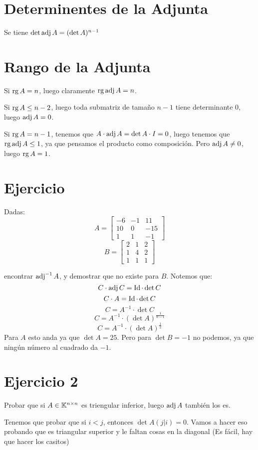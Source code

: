 \documentclass{article}
\begin{document}
\section*{Determinentes de la Adjunta}
Se tiene $\det \operatorname{adj} A = (\det A)^{n-1}$
\section*{Rango de la Adjunta}
Si $\operatorname{rg} A = n$, luego claramente $\operatorname{rg} \operatorname{adj} A = n$.

Si $\operatorname{rg} A \leq n-2$, luego toda submatriz de tamaño $n-1$ tiene determinante $0$, luego $\operatorname{adj} A = 0$.

Si $\operatorname{rg} A = n-1$, tenemos que $A \cdot \operatorname{adj} A = \det A \cdot I = 0$, luego tenemos que $\operatorname{rg} \operatorname{adj} A \leq 1$, ya que pensamos el producto como composición. Pero $\operatorname{adj} A \neq 0$, luego $\operatorname{rg} A = 1$.

\section*{Ejercicio}
Dadas:
\[
	A = 
	\begin{bmatrix}
		-6 & -1 & 11 \\
		10 & 0 & -15 \\
		1 & 1 & -1
	\end{bmatrix}
\]
\[
	B = 
	\begin{bmatrix}
		2 & 1 & 2 \\
		1 & 4 & 2 \\
		1 & 1 & 1
	\end{bmatrix}
\]

encontrar $\operatorname{adj}^{-1} A$, y demostrar que no existe para $B$.
Notemos que:
\[
	C \cdot \operatorname{adj} C = \operatorname{Id} \cdot \det C
\]
\[
	C \cdot A = \operatorname{Id} \cdot \det C
\]
\[
	C = A^{-1} \cdot \det C
\]
\[
	C = A^{-1} \cdot (\det A)^{\frac{1}{n-1}}
\]
\[
	C = A^{-1} \cdot (\det A)^{\frac{1}{2}}
\]
Para $A$ esto anda ya que $\det A = 25$. Pero para $\det B = -1$ no podemos, ya que ningún número al cuadrado da $-1$.

\section*{Ejercicio 2}
Probar que si $A \in \mathbb{K}^{n \times n}$ es triengular inferior, luego $\operatorname{adj} A$ también los es.

Tenemos que probar que si $i < j$, entonces $\det A(j|i) = 0$. Vamos a hacer eso probando que es triangular superior y le faltan cosas en la diagonal (Es fácil, hay que hacer los casitos)
\end{document}
